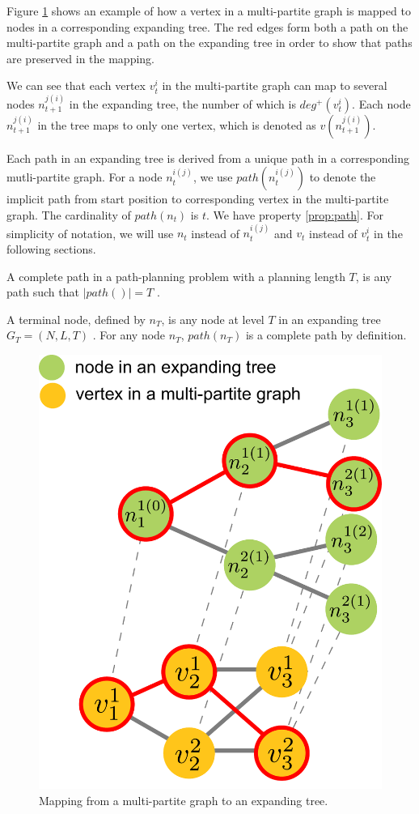 Figure \ref{fig:multipartite_expandingtree} shows an example of how a vertex in a multi-partite graph is mapped to nodes in a corresponding expanding tree. The red edges form both a path on the multi-partite graph and a path on the expanding tree in order to show that paths are preserved in the mapping. 

We can see that each vertex $ v^{i}_{t} $ in the multi-partite graph can map to several nodes $ n^{j(i)}_{t+1} $ in the expanding tree, the number of which is $ deg^{+}(v^{i}_{t})$. Each node $ n^{j(i)}_{t+1} $ in the tree maps to only one vertex, which is denoted as $ v(n^{j(i)}_{t+1}) $.

Each path in an expanding tree is derived from a unique path in a corresponding mutli-partite graph.
For a node $ n_{t}^{i(j)} $, we use $ path(n_{t}^{i(j)}) $ to denote the implicit path from start position to corresponding vertex in the multi-partite graph.
The cardinality of $ path(n_{t}) $ is $ t $.
We have property \ref{prop:path}.
For simplicity of notation, we will use $ n_{t} $ instead of $ n_{t}^{i(j)} $ and $ v_{t} $ instead of $ v_{t}^{i} $ in the following sections. 

\begin{mydef}
\label{def:complete_path}
A complete path in a path-planning problem with a planning length $ T $, is any path such that
$ | path() | = T  $ .
\end{mydef}

\begin{mydef}
\label{def:terminal_node}
A terminal node, defined by $ n_{T} $, is any node at level $ T $ in an expanding tree $ G_{T} = (N, L, T) $ . 
For any node $ n_{T} $, $ path(n_{T}) $ is a complete path by definition.
\end{mydef}

\begin{figure}
\centering
\includegraphics[width=0.4\linewidth]{./images/multipartite_expandingtree.pdf}
\caption{Mapping from a multi-partite graph to an expanding tree.}
\label{fig:multipartite_expandingtree}
\end{figure}

